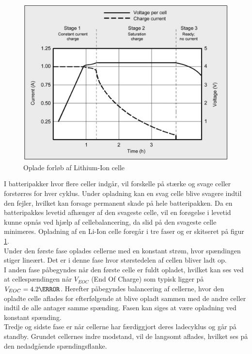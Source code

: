 \begin{figure}[h]
	\centering
	\includegraphics[width=15cm]{billeder/liion_opladning.png}
	\caption{Oplade forløb af Lithium-Ion celle}
	\label{fig:opladning_liion}
\end{figure}
\FloatBlock

I batteripakker hvor flere celler indgår, vil forskelle på stærke og svage celler forstørres for hver cyklus. Under opladning kan en svag celle blive svagere indtil den fejler, hvilket kan forsage permanent skade på hele batteripakken. Da en batteripakkes levetid afhænger af den svageste celle, vil en forøgelse i levetid kunne opnås ved hjælp af cellebalancering, da slid på den svageste celle minimeres. Opladning af en Li-Ion celle foregår i tre faser og er skitseret på figur \ref{fig:opladning_liion}.
\\

Under den første fase oplades cellerne med en konstant strøm, hvor spændingen stiger lineært. Det er i denne fase hvor størstedelen af cellen bliver ladt op.
\\

I anden fase påbegyndes når den første celle er fuldt opladet, hvilket kan ses ved at cellespændingen når $V_{EOC}$ (End Of Charge) som typisk ligger på $V_{EOC} = 4.2 \volt$. Herefter påbegyndes balancering af cellerne, hvor den opladte celle aflades for efterfølgende at blive opladt sammen med de andre celler indtil de alle antager samme spænding.
Fasen kan siges at være opladning ved konstant spænding.
\\

Tredje og sidste fase er når cellerne har færdiggjort deres ladecyklus og går på standby. Grundet cellernes indre modstand, vil de langsomt aflades, hvilket ses på den nedadgående spændingsflanke.


